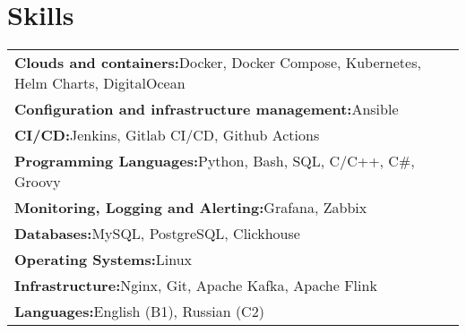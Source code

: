 \documentclass[a4paper,12pt]{article}
\begin{document}
    \section{Skills}
    \renewcommand{\arraystretch}{1.1}
    \begin{tabularx}{\linewidth}{@{}l X@{}}
        \textbf{Clouds and containers:}\quad Docker, \quad Docker Compose, \quad Kubernetes, \quad Helm Charts, \quad DigitalOcean \\
        \textbf{Configuration and infrastructure management:}\quad Ansible \\
        \textbf{CI/CD:}\quad Jenkins, \quad Gitlab CI/CD, \quad Github Actions \\
        \textbf{Programming Languages:}\quad Python, \quad Bash, \quad SQL, \quad C/C++, \quad C\#, \quad Groovy \\
        \textbf{Monitoring, Logging and Alerting:}\quad Grafana, \quad Zabbix \\
        \textbf{Databases:}\quad MySQL, \quad PostgreSQL, \quad Clickhouse \\
        \textbf{Operating Systems:}\quad Linux \\
        \textbf{Infrastructure:}\quad Nginx, \quad Git, \quad Apache Kafka, \quad Apache Flink \\
        \textbf{Languages:}\quad English (B1), \quad Russian (C2) \\
    \end{tabularx}
\end{document}
